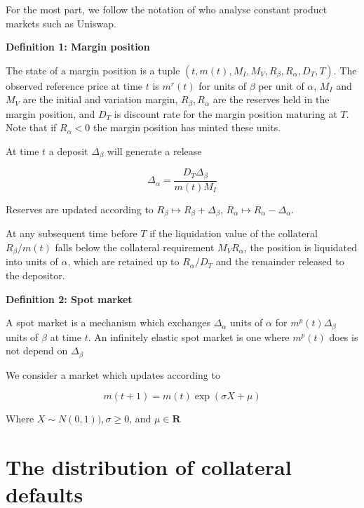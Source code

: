 \documentclass[12pt]{article}
\begin{document}
For the most part, we follow the notation of \cite{ang20} who analyse constant product markets such as Uniswap.

\textbf{Definition 1: Margin position}


The state of a margin position is a tuple $(t, m(t), M_I, M_V, R_\beta, R_\alpha, D_T, T)$. The observed reference price at time $t$ is $m^r(t)$ for units of $\beta$ per unit of $\alpha$, $M_I$ and $M_V$ are the initial and variation margin, $R_\beta, R_\alpha$ are the reserves held in the margin position, and $D_T$ is discount rate for the margin position maturing at $T$. Note that if $R_\alpha<0$ the margin position has minted these units.

At time $t$ a deposit $\Delta_\beta$  will generate a release 

\begin{equation} \label{Delta_alpha}
\Delta_\alpha = \frac{D_T \Delta_\beta}{m(t) M_I }
\end{equation}


Reserves are updated according to $R_\beta \mapsto R_\beta + \Delta_\beta$, $R_\alpha \mapsto R_\alpha - \Delta_\alpha$. 

At any subsequent time before $T$ if the liquidation value of the collateral $R_\beta/m(t)$ falls below the collateral requirement $M_V R_\alpha$, the position is liquidated into units of $\alpha$, which are retained up to $R_\alpha/D_T$ and the remainder released to the depositor.   

\textbf{Definition 2: Spot market}

A spot market is a mechanism which exchanges $\Delta_\alpha$ units of $\alpha$ for $m^p(t)\Delta_\beta$ units of $\beta$ at time $t$. An infinitely elastic spot market is one where $m^p(t)$ does is not depend on $\Delta_\beta$

We consider a market which updates according to 

\[ m(t+1) = m(t)\exp( \sigma X + \mu) \]

Where $X \sim N(0,1)), \sigma \geq 0$, and  $\mu \in \mathbf{R}$

\section{The distribution of collateral defaults}
\end{document}
